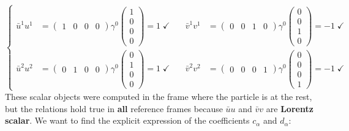 \documentclass[../main.tex]{subfiles}
\begin{document}
\[
\left\{
\begin{aligned}
\bar{u}^1u^1&=\left(\begin{array}{cccc}
    1 & 0 & 0 & 0
\end{array}\right)\gamma^0\left(\begin{array}{c}
    1 \\
    0 \\
    0 \\
    0
\end{array}\right)=1 \; \checkmark\\
\bar{u}^2u^2&=\left(\begin{array}{cccc}
    0 & 1 & 0 & 0
\end{array}\right)\gamma^0\left(\begin{array}{c}
    0 \\
    1 \\
    0 \\
    0
\end{array}\right)=1 \; \checkmark
\end{aligned}
\right.
\quad 
\begin{aligned}
\bar{v}^1v^1&=\left(\begin{array}{cccc}
    0 & 0 & 1 & 0
\end{array}\right)\gamma^0\left(\begin{array}{c}
    0 \\
    0 \\
    1 \\
    0
\end{array}\right)=-1 \; \checkmark\\
\bar{v}^2v^2&=\left(\begin{array}{cccc}
    0 & 0 & 0 & 1
\end{array}\right)\gamma^0\left(\begin{array}{c}
    0 \\
    0 \\
    0 \\
    1
\end{array}\right)=-1 \; \checkmark
\end{aligned}
\]
These scalar objects were computed in the frame where the particle is at the rest, but the relations hold true in \textbf{all} reference frames because $\bar{u}u$ and $\bar{v}v$ are \textbf{Lorentz scalar}. We want to find the explicit expression of the coefficients $c_\alpha$ and $d_\alpha$:
\end{document}
